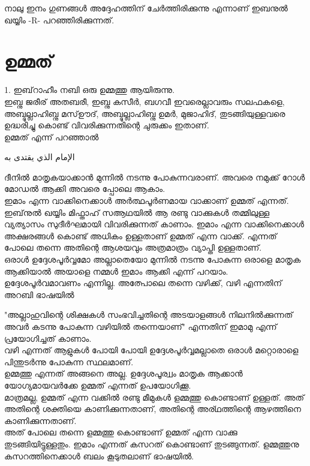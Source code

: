   
  \textarabic{\quranayah[16][120]}
    \textarabic{\quranayah[16][121]}
 
 നാലു ഇനം ഗുണങ്ങൾ അദ്ദേഹത്തിന് ചേർത്തിരിക്കുന്നു എന്നാണ് ഇബനുൽ ഖയ്യിം -R-   പറഞ്ഞിരിക്കുന്നത്.  
 
 
 \section*{\textmalayalam{ഉമ്മത്}}
 1. ഇബ്‌റാഹീം നബി ഒരു ഉമ്മത്തു ആയിരുന്നു. \\ 
 ഇബ്നു ജരീര് അതബരീ, ഇബ്നു കസീർ, ബഗവീ ഇവരെല്ലാവരും സലഫകളെ, അബ്ദുല്ലാഹിബ്നു മസ്ഊദ്,  അബ്ദുല്ലാഹിബ്നു ഉമർ, മുജാഹിദ്, തുടങ്ങിയുള്ളവരെ ഉദ്ധരിച്ചു കൊണ്ട് വിവരിക്കുന്നതിന്റെ ചുരുക്കം ഇതാണ്. \\
  ഉമ്മത് എന്ന് പറഞ്ഞാൽ
   
 \textarabic{الإمام الذي يقتدى به} 
  
 ദീനിൽ മാതൃകയാക്കാൻ മുന്നിൽ നടന്നു പോകുന്നവരാണ്.  അവരെ നമുക്ക് റോൾ മോഡൽ ആക്കി അവരെ പ്പോലെ ആകാം. \\
 
 ഇമാം എന്ന വാക്കിനെക്കാൾ അർത്ഥപൂർണമായ വാക്കാണ് ഉമ്മത് എന്നത്. ഇബ്‌നുൽ ഖയ്യിം മിഫ്താഹ് സആഥയിൽ ആ രണ്ടു വാക്കുകൾ തമ്മിലുള്ള വ്യത്യാസം സുദീർഘമായി വിവരിക്കുന്നത് കാണാം.   ഇമാം എന്ന വാക്കിനെക്കാൾ  അക്ഷരങ്ങൾ കൊണ്ട് അധികം ഉള്ളതാണ് ഉമ്മത് എന്ന വാക്ക്.  എന്നത് പോലെ തന്നെ അതിന്റെ ആശയവും അത്രമാത്രം വ്യാപ്തി ഉള്ളതാണ്. \\
 
 ഒരാൾ ഉദ്ദേശപൂർവ്വമോ അല്ലാതെയോ മുന്നിൽ നടന്നു പോകുന്ന ഒരാളെ മാതൃക ആക്കിയാൽ അയാളെ നമ്മൾ ഇമാം ആക്കി എന്ന് പറയാം. ഉദ്ദേശപൂർവമാവണം എന്നില്ല. അത്പോലെ തന്നെ വഴിക്ക്, വഴി എന്നതിന് അറബി ഭാഷയിൽ  
 
  \textarabic{ \quranayah[15][79]}
        
  "അല്ലാഹുവിന്റെ ശിക്ഷകൾ സംഭവിച്ചതിന്റെ അടയാളങ്ങൾ നിലനിൽക്കുന്നത് അവർ കടന്നു പോകുന്ന വഴിയിൽ തന്നെയാണ്" എന്നതിന് ഇമാമു എന്ന് പ്രയോഗിച്ചത് കാണാം. \\ 
  
  വഴി എന്നത് ആളുകൾ പോയി പോയി ഉദ്ദേശപൂർവ്വമല്ലാതെ ഒരാൾ മറ്റൊരാളെ പിന്തുടർന്നു പോകുന്ന സ്ഥലമാണ്. \\ 
  ഉമ്മത്തു എന്നത് അങ്ങനെ അല്ല. ഉദ്ദേശപൂര്വ്വം മാതൃക ആക്കാൻ യോഗ്യമായവർക്കേ ഉമ്മത് എന്നത് ഉപയോഗിക്കൂ. \\
  
   മാത്രമല്ല, ഉമ്മത് എന്ന വക്കിൽ രണ്ടു മീമുകൾ ളമ്മത്തു കൊണ്ടാണ് ഉള്ളത്. അത് അതിന്റെ ശക്തിയെ കാണിക്കുന്നതാണ്, അതിന്റെ അര്ഥത്തിന്റെ ആഴത്തിനെ കാണിക്കുന്നതാണ്. \\ 
   
   അത് പോലെ  തന്നെ ളമ്മത്തു കൊണ്ടാണ് ഉമ്മത് എന്ന വാക്കു തുടങ്ങിയിട്ടുള്ളതും. ഇമാം എന്നത് കസറത്‌ കൊണ്ടാണ് തുടങ്ങുന്നത്. ളമ്മത്തുനു കസറത്തിനെക്കാൾ ബലം കൂടുതലാണ് ഭാഷയിൽ. \\
   
